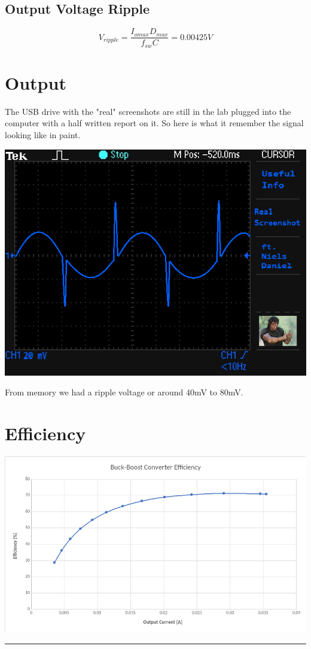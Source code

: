 \documentclass[11pt]{article}
\begin{document}
\begin{preview}
        \subsection*{Output Voltage Ripple}
            $$V_{ripple}=\frac{I_{omax}D_{max}}{f_{sw}C}=0.00425V$$
    \section{Output}
    The USB drive with the "real" screenshots are still in the lab plugged into the computer with a half written report on it. So here is what it remember the signal looking like in paint. 
        \begin{center}
            \includegraphics[width=\textwidth]{img/out.png}
        \end{center}
        From memory we had a ripple voltage or around 40mV to 80mV.
    \section{Efficiency}
        \begin{center}
            \includegraphics[width=\textwidth]{img/eff.png}
        \end{center}
    \hrule
\end{preview}
\end{document}
